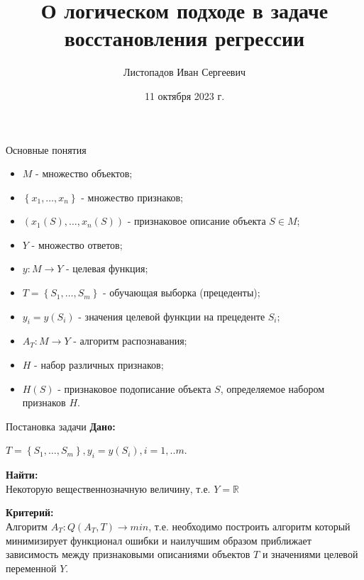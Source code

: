 \documentclass[10pt,pdf,unicode,aspectratio=169]{beamer}
\title{О логическом подходе в задаче восстановления регрессии} %
\author{Листопадов Иван Сергеевич} %
\date{11 октября 2023 г.} %
\institute[\UniverAbbr] %
{
  \Univer \\
  \Faculty \\
  \Department 
}
\begin{document}

\frame{\titlepage} %


\begin{frame}{Основные понятия}

\begin{itemize}
  \item $M$ - множество объектов;

  \item $\left\{x_{1}, \ldots, x_{n}\right\}$ - множество признаков;

  \item $\left(x_{1}(S), \ldots, x_{n}(S)\right)$ - признаковое описание объекта $S \in M$;

  \item $Y$ - множество ответов;

  \item $y: M \rightarrow Y$ - целевая функция;

  \item $T=\left\{S_{1}, \ldots, S_{m}\right\}$ - обучающая выборка (прецеденты);

  \item $y_{i}=y\left(S_{i}\right)$ - значения целевой функции на прецеденте $S_{i}$;

  \item $A_{T}: M \rightarrow Y$ - алгоритм распознавания;

  \item $H$ - набор различных признаков;

  \item $H(S)$ - признаковое подописание объекта $S$, определяемое набором признаков $H$.
\end{itemize}

\end{frame}

\begin{frame}{Постановка задачи}
\textbf{Дано:}

$T=\left\{S_{1}, \ldots, S_{m}\right\}, y_{i}=y\left(S_{i}\right), i=1,..m$.

\textbf{Найти:}\\ Некоторую вещественнозначную величину, т.е. $Y = \mathbb{R}$

\textbf{Критерий:}\\ Алгоритм $A_{T}: Q(A_{T}, T) \rightarrow min$, т.е. необходимо построить алгоритм который минимизирует функционал ошибки и наилучшим образом приближает зависимость между признаковыми описаниями объектов $T$ и значениями целевой переменной $Y$.
\end{frame}
\end{document}
